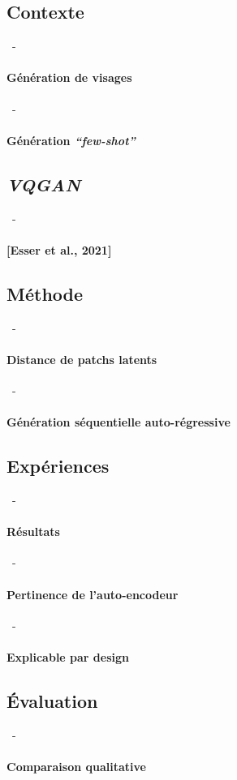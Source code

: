 \documentclass[aspectratio=169, 22pt]{beamer}
\begin{document}
\subsection{Contexte}
\begin{frame}{\secname~- \subsecname}
  \framesubtitle{Génération de visages}
\end{frame}

\begin{frame}{\secname~- \subsecname}
  \framesubtitle{Génération \emph{``few-shot''}}
\end{frame}

\subsection{\emph{VQGAN}}
\begin{frame}{\secname~- \subsecname}
  \framesubtitle{[Esser et al., 2021]}
\end{frame}

\subsection{Méthode}
\begin{frame}{\secname~- \subsecname}
  \framesubtitle{Distance de patchs latents}
\end{frame}

\begin{frame}{\secname~- \subsecname}
  \framesubtitle{Génération séquentielle auto-régressive}
\end{frame}

\subsection{Expériences}
\begin{frame}{\secname~- \subsecname}
  \framesubtitle{Résultats}
\end{frame}

\begin{frame}{\secname~- \subsecname}
  \framesubtitle{Pertinence de l'auto-encodeur}
\end{frame}

\begin{frame}{\secname~- \subsecname}
  \framesubtitle{Explicable par design}
\end{frame}

\subsection{Évaluation}
\begin{frame}{\secname~- \subsecname}
  \framesubtitle{Comparaison qualitative}
\end{frame}
\end{document}

